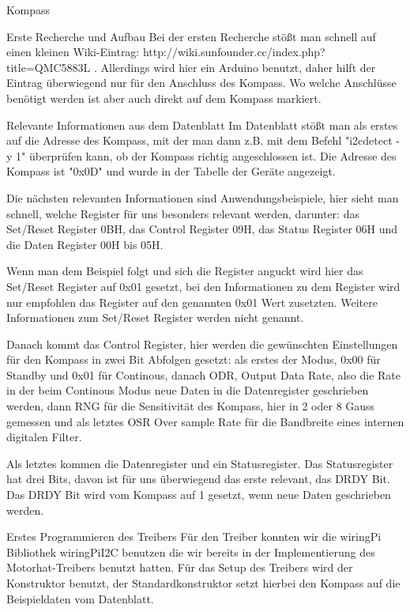 \documentclass[12pt]{report}
\begin{document}
\begin{section}{Kompass}
  \begin{subsection}{Erste Recherche und Aufbau}
  Bei der ersten Recherche stößt man schnell auf einen kleinen Wiki-Eintrag: 
  http://wiki.sunfounder.cc/index.php?title=QMC5883L .
  Allerdings wird hier ein Arduino benutzt, daher hilft der Eintrag überwiegend nur für den 
  Anschluss des Kompass. Wo welche Anschlüsse benötigt werden ist aber auch direkt auf dem Kompass markiert.
  \end{subsection}
  \begin{subsection}{Relevante Informationen aus dem Datenblatt}
  Im Datenblatt stößt man als erstes auf die \itoc{} Adresse des Kompass, mit der man dann z.B. mit dem Befehl 
  "i2cdetect -y 1" überprüfen kann, ob der Kompass richtig angeschlossen ist. Die Adresse des Kompass ist "0x0D" 
  und wurde in der Tabelle der \itoc{} Geräte angezeigt.
  
  Die nächsten relevanten Informationen sind Anwendungsbeispiele, hier sieht man schnell, welche Register für 
  uns besonders relevant werden, darunter: das Set/Reset Register 0BH, das Control Register 09H, das Status 
  Register 06H und die Daten Register 00H bis 05H. 
  
  Wenn man dem Beispiel folgt und sich die Register anguckt wird hier das Set/Reset Register auf 0x01 gesetzt, 
  bei den Informationen zu dem Register wird nur empfohlen das Register auf den genannten 0x01 Wert zusetzten. 
  Weitere Informationen zum Set/Reset Register werden nicht genannt.
  
  Danach kommt das Control Register, hier werden die gewünschten Einstellungen für den Kompass in zwei Bit 
  Abfolgen gesetzt: als erstes der Modus, 0x00 für Standby und 0x01 für Continous, danach ODR, Output Data Rate, 
  also die Rate in der beim Continous Modus neue Daten in die Datenregister geschrieben werden, dann RNG für die 
  Sensitivität des Kompass, hier in 2 oder 8 Gauss gemessen und als letztes OSR Over sample Rate für die 
  Bandbreite eines internen digitalen Filter.
  
  Als letztes kommen die Datenregister und ein Statusregister. Das Statusregister hat drei Bits, davon ist für 
  uns überwiegend das erste relevant, das DRDY Bit. Das DRDY Bit wird vom Kompass auf 1 gesetzt, wenn neue Daten 
  geschrieben werden.
  
  \end{subsection}
  \begin{subsection}{Erstes Programmieren des Treibers}
  Für den Treiber konnten wir die wiringPi Bibliothek wiringPiI2C benutzen die wir bereits in der 
  Implementierung des Motorhat-Treibers benutzt hatten. Für das Setup des Treibers wird der Konstruktor benutzt, 
  der Standardkonstruktor setzt hierbei den Kompass auf die Beispieldaten vom Datenblatt.
  

\end{subsection}
\end{section}
\end{document}
